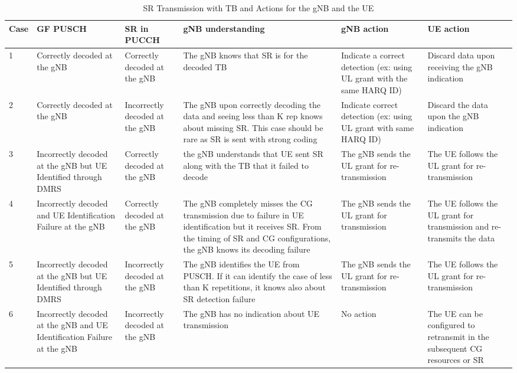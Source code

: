 \documentclass[conference]{IEEEtran}
\begin{document}
\begin{table}[htbp]
\caption{SR Transmission with TB and Actions for the gNB and the UE}
\begin{center}
\begin{tabular}{|p{1.5em}|p{10em}|p{9em}|p{16em}|p{9em}|p{9em}|}
 \hline
 \textbf{Case} & \textbf{GF PUSCH} & \textbf{SR in PUCCH} & \textbf{gNB understanding} & \textbf{gNB action} & \textbf{UE action}\\ 
 \hline
 1 & Correctly decoded at the gNB & Correctly decoded at the gNB & The gNB knows that SR is for the decoded TB & Indicate a correct detection (ex: using UL grant with the same HARQ ID) & Discard data upon receiving the gNB indication\\
 \hline
 2 &  Correctly decoded at the gNB & Incorrectly decoded at the gNB & The gNB upon correctly decoding the data and seeing less than K rep knows about missing SR. This case should be rare as SR is sent with strong coding & Indicate correct detection (ex: using UL grant with same HARQ ID) & Discard the data upon the gNB indication\\
\hline
3 & Incorrectly decoded at the gNB but UE Identified through DMRS & Correctly decoded at the gNB & the gNB understands that UE sent SR along with the TB that it failed to decode & The gNB sends the UL grant for re-transmission & The UE follows the UL grant for re-transmission\\
\hline
4 & Incorrectly decoded and UE Identification Failure at the gNB & Correctly decoded at the gNB & The gNB completely misses the CG transmission due to failure in UE identification but it receives SR. From the timing of SR and CG configurations, the gNB knows its decoding failure & The gNB sends the UL grant for transmission & The UE follows the UL grant for transmission and re-transmits the data\\
\hline
5 & Incorrectly decoded at the gNB but UE Identified through DMRS & Incorrectly decoded at the gNB & The gNB identifies the UE from PUSCH. If it can identify the case of less than K repetitions, it knows also about SR detection failure & The gNB sends the UL grant for re-transmission & The UE follows the UL grant for re-transmission\\
\hline
 6 & Incorrectly decoded at the gNB and UE Identification Failure at the gNB & Incorrectly decoded at the gNB & The gNB has no indication about UE transmission & No action & The UE can be configured to
retransmit in the subsequent CG resources or SR\\
 

 
 \hline
\end{tabular}
\label{tab1}
\end{center}
\vspace{-7mm}
\end{table}
\end{document}
